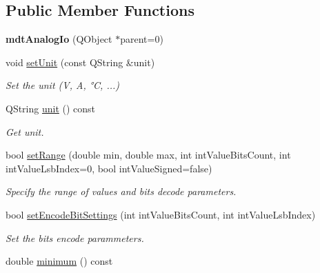 \subsection*{Public Member Functions}
\begin{DoxyCompactItemize}
\item 
\hypertarget{classmdt_analog_io_affcdf039a10023b495cf49a5f476f829}{
{\bfseries mdtAnalogIo} (QObject $\ast$parent=0)}
\label{classmdt_analog_io_affcdf039a10023b495cf49a5f476f829}

\item 
\hypertarget{classmdt_analog_io_afb4cd82bee1ac1e77148c8621b1c66fa}{
void \hyperlink{classmdt_analog_io_afb4cd82bee1ac1e77148c8621b1c66fa}{setUnit} (const QString \&unit)}
\label{classmdt_analog_io_afb4cd82bee1ac1e77148c8621b1c66fa}

\begin{DoxyCompactList}\small\item\em Set the unit (V, A, °C, ...) \end{DoxyCompactList}\item 
\hypertarget{classmdt_analog_io_a126d5b9bf4a0bb9ce9f2ff6a010fef0e}{
QString \hyperlink{classmdt_analog_io_a126d5b9bf4a0bb9ce9f2ff6a010fef0e}{unit} () const }
\label{classmdt_analog_io_a126d5b9bf4a0bb9ce9f2ff6a010fef0e}

\begin{DoxyCompactList}\small\item\em Get unit. \end{DoxyCompactList}\item 
bool \hyperlink{classmdt_analog_io_ab5733c8d4f49da6e6d4f11f1e1aa9555}{setRange} (double min, double max, int intValueBitsCount, int intValueLsbIndex=0, bool intValueSigned=false)
\begin{DoxyCompactList}\small\item\em Specify the range of values and bits decode parameters. \end{DoxyCompactList}\item 
bool \hyperlink{classmdt_analog_io_a2263d9b0bf2c1b998386c590866f06e8}{setEncodeBitSettings} (int intValueBitsCount, int intValueLsbIndex)
\begin{DoxyCompactList}\small\item\em Set the bits encode parammeters. \end{DoxyCompactList}\item 
\hypertarget{classmdt_analog_io_acd2b8cb33d5d42abf23672ad7675825e}{
double \hyperlink{classmdt_analog_io_acd2b8cb33d5d42abf23672ad7675825e}{minimum} () const }
\label{classmdt_analog_io_acd2b8cb33d5d42abf23672ad7675825e}


\end{DoxyCompactItemize}
